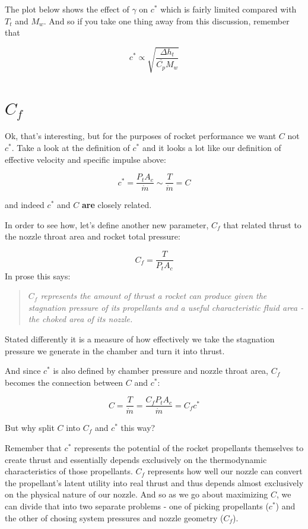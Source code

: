 \documentclass[twocolumn]{memoir} %
\begin{document}
The plot below shows the effect of $\gamma$ on $c^*$ which is fairly
limited compared with $T_t$ and $M_w$. And so if you take one thing
away from this discussion, remember that

\begin{equation}c^* \propto \sqrt{\frac{\Delta h_t}{\overline{C_p} M_w}}
\end{equation}

\section{$C_f$}

Ok, that's interesting, but for the purposes of rocket performance we
want \(C\) not \(c^*\). Take a look at the definition of \(c^*\) and it
looks a lot like our definition of effective velocity and specific
impulse above:

\begin{equation}c^* = \frac{P_t A_c}{\dot{m}} \sim \frac{T}{\dot{m}} = C
\end{equation}

and indeed \(c^*\) and \(C\) \textbf{are} closely related.

In order to see how, let's define another new parameter, \(C_f\) that
related thrust to the nozzle throat area and rocket total pressure:

\begin{equation}C_f = \frac{T}{P_t A_c}
\end{equation}
In prose this says:
\begin{quote}
    \emph{\(C_f\) represents the amount of thrust a rocket can produce given the
stagnation pressure of its propellants and a useful characteristic fluid
    area - the choked area of its nozzle.}
\end{quote}

Stated differently it is a measure of how effectively we take the
stagnation pressure we generate in the chamber and turn it into thrust.

And since \(c^*\) is also defined by chamber pressure and nozzle throat
area, \(C_f\) becomes the connection between \(C\) and \(c^*\):

\begin{equation}C = \frac{T}{\dot{m}} = \frac{C_f P_t A_c}{\dot{m}} = C_f c^*
\end{equation}

But why split \(C\) into \(C_f\) and \(c^*\) this way?

Remember that \(c^*\) represents the potential of the rocket propellants
themselves to create thrust and essentially depends exclusively on the
thermodynamic characteristics of those propellants. \(C_f\) represents
how well our nozzle can convert the propellant's latent utility into
real thrust and thus depends almost exclusively on the physical nature
of our nozzle. And so as we go about maximizing \(C\), we can divide
that into two separate problems - one of picking propellants (\(c^*\))
and the other of chosing system pressures and nozzle geometry (\(C_f\)).
\end{document}
